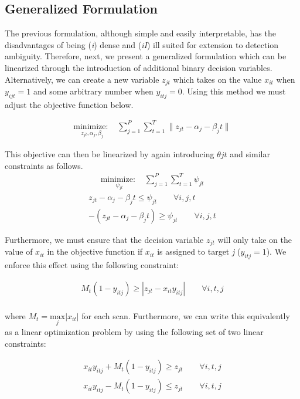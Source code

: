 \documentclass[journal]{IEEEtran}
\begin{document}
\subsection{Generalized Formulation}
The previous formulation, although simple and easily interpretable, has the disadvantages of being (\textit{i}) dense and (\textit{iI}) ill suited for extension to detection ambiguity. Therefore, next, we present a generalized formulation which can be linearized through the introduction of additional binary decision variables. Alternatively, we can create a new variable $z_{jt}$ which takes on the value $x_{it}$ when $y_{ijt}=1$ and some arbitrary number when $y_{itj}=0$. Using this method we must adjust the objective function below. 

\begin{align}\label{eq:generalized_objective}
\underset{z_{jt}, \alpha_{j}, \beta_{j}}{\text{minimize: }} & \sum_{j=1}^{P} \sum_{t=1}^{T} \|z_{jt} - \alpha_{j} - \beta_{j}t\|
\end{align}

This objective can then be linearized by again introducing $\theta{jt}$ and similar constraints as follows. 
\begin{align}\label{eq:generalized_linear_objective}
\underset{\psi_{jt}}{\text{minimize: }} & \sum_{j=1}^{P} \sum_{t=1}^{T} \psi_{jt}
\end{align}
\begin{align}
z_{jt} - \alpha_{j} - \beta_{j}t \leq \psi_{jt} \qquad \forall i,j,t\\
-(z_{jt} - \alpha_{j} - \beta_{j}t) \geq \psi_{jt} \qquad \forall i,j,t
\end{align}
 
Furthermore, we must ensure that the decision variable $z_{jt}$ will only take on the value of $x_{it}$ in the objective function if $x_{it}$ is assigned to target \textit{j} ($y_{itj} = 1$). We enforce this effect using the following constraint:

\begin{align}
M_{t}(1-y_{itj}) \geq |z_{jt} - x_{it}y_{itj}| \qquad \forall i,t,j\\
\end{align}

where $M_{t} = \underset{j}{\text{max}}|x_{it}|$ for each scan. Furthermore, we can write this equivalently as a linear optimization problem by using the following set of two linear constraints:

\begin{align}
x_{it}y_{itj} + M_{t}(1-y_{itj}) \geq z_{jt} \qquad \forall i,t,j\\
x_{it}y_{itj} - M_{t}(1-y_{itj}) \leq z_{jt} \qquad \forall i,t,j
\end{align}
\end{document}
